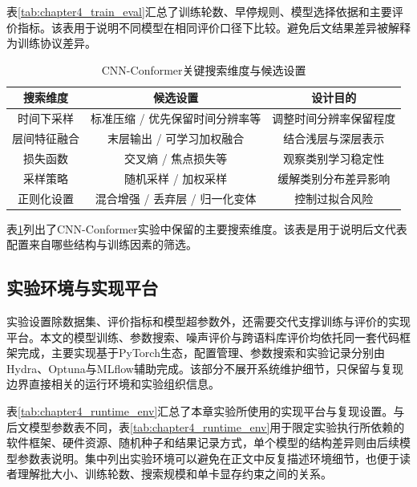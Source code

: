 表\ref{tab:chapter4_train_eval}汇总了训练轮数、早停规则、模型选择依据和主要评价指标。该表用于说明不同模型在相同评价口径下比较。避免后文结果差异被解释为训练协议差异。

\begin{table}[!htbp]
    \centering
    \caption{CNN-Conformer关键搜索维度与候选设置}
    \label{tab:chapter4_conformer_search_space}
    \begin{tabular}{ccc}
        \toprule
        搜索维度 & 候选设置 & 设计目的 \\
        \midrule
        时间下采样 & 标准压缩 / 优先保留时间分辨率等 & 调整时间分辨率保留程度 \\
        层间特征融合 & 末层输出 / 可学习加权融合 & 结合浅层与深层表示 \\
        损失函数 & 交叉熵 / 焦点损失等 & 观察类别学习稳定性 \\
        采样策略 & 随机采样 / 加权采样 & 缓解类别分布差异影响 \\
        正则化设置 & 混合增强 / 丢弃层 / 归一化变体 & 控制过拟合风险 \\
        \bottomrule
    \end{tabular}
\end{table}

表\ref{tab:chapter4_conformer_search_space}列出了CNN-Conformer实验中保留的主要搜索维度。该表是用于说明后文代表配置来自哪些结构与训练因素的筛选。

\subsection{实验环境与实现平台}

实验设置除数据集、评价指标和模型超参数外，还需要交代支撑训练与评价的实现平台。本文的模型训练、参数搜索、噪声评价与跨语料库评价均依托同一套代码框架完成，主要实现基于PyTorch生态，配置管理、参数搜索和实验记录分别由Hydra、Optuna与MLflow辅助完成。该部分不展开系统维护细节，只保留与复现边界直接相关的运行环境和实验组织信息。

表\ref{tab:chapter4_runtime_env}汇总了本章实验所使用的实现平台与复现设置。与后文模型参数表不同，表\ref{tab:chapter4_runtime_env}用于限定实验执行所依赖的软件框架、硬件资源、随机种子和结果记录方式，单个模型的结构差异则由后续模型参数表说明。集中列出实验环境可以避免在正文中反复描述环境细节，也便于读者理解批大小、训练轮数、搜索规模和单卡显存约束之间的关系。

